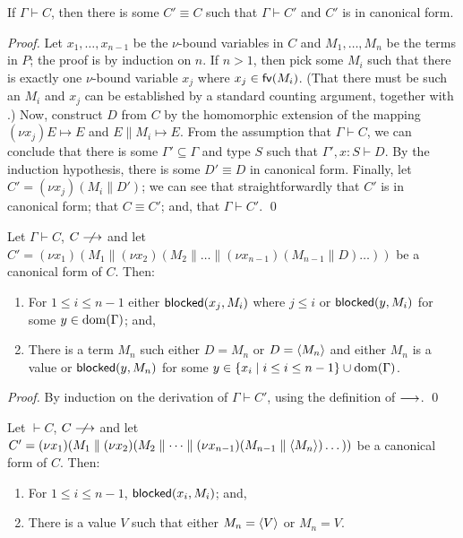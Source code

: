 \documentclass[orivec,envcountsame]{llncs}
\begin{document}
\begin{lemma}\label{thm:canonical}
  If $\Gamma \vdash C$, then there is some $C' \equiv C$ such that $\Gamma \vdash C'$ and $C'$ is in
  canonical form.
\end{lemma}

\begin{proof}
  Let $x_1,\dots,x_{n-1}$ be the $\nu$-bound variables in $C$ and $M_1,\dots,M_n$ be the terms in
  $P$; the proof is by induction on $n$.  If $n > 1$, then pick some $M_i$ such that there is
  exactly one $\nu$-bound variable $x_j$ where $x_j \in \mathsf{fv}(M_i)$.  (That there must be such an
  $M_i$ and $x_j$ can be established by a standard counting argument, together with
  .)  Now, construct $D$ from $C$ by the homomorphic extension of
  the mapping $(\nu x_j)E \mapsto E$ and $E \parallel M_i \mapsto E$.  From the assumption that
  $\Gamma \vdash C$, we can conclude that there is some $\Gamma' \subseteq \Gamma$ and type $S$ such
  that $\Gamma',x:S \vdash D$.  By the induction hypothesis, there is some $D' \equiv D$ in
  canonical form.  Finally, let $C' = (\nu x_j)(M_i \parallel D')$; we can see that
  straightforwardly that $C'$ is in canonical form; that $C \equiv C'$; and, that $\Gamma \vdash
  C'$. \qed
\end{proof}

\begin{theorem}\label{thm:progress-open}
  Let $\Gamma \vdash C$, $C \centernot\ceval$ and let $C' = (\nu x_1)(M_1 \parallel (\nu
  x_2)(M_2 \parallel \dots \parallel (\nu x_{n-1})(M_{n-1} \parallel D)\dots))$ be
  a canonical form of $C$.  Then:
  \begin{enumerate}
  \item For $1 \leq i \leq n - 1$ either $\mathsf{blocked}(x_j,M_i)$ where $j \leq i$ or $\mathsf{blocked}(y,M_i)$
    for some $y \in \operatorname{dom}(\Gamma)$; and,
  \item There is a term $M_n$ such either $D = M_n$ or $D = \langle M_n \rangle$ and either $M_n$ is a
    value or $\mathsf{blocked}(y,M_n)$ for some $y \in \{ x_i \mid i \leq i \leq n - 1 \} \cup
    \operatorname{dom}(\Gamma)$.
  \end{enumerate}
\end{theorem}

\begin{proof}
  By induction on the derivation of $\Gamma \vdash C'$, using the definition of $\longrightarrow$. \qed
\end{proof}

\begin{corollary}\label{thm:progress}
  Let $\vdash C$, $C \centernot\ceval$ and let $C' = (\nu x_1)(M_1 \parallel (\nu
  x_2)(M_2 \parallel \dots \parallel (\nu x_{n-1})(M_{n-1} \parallel \langle M_n \rangle)\dots))$ be
  a canonical form of $C$.  Then:
  \begin{enumerate}
  \item For $1 \leq i \leq n - 1$, $\mathsf{blocked}(x_i,M_i)$; and,
  \item There is a value $V$ such that either $M_n = \langle V \rangle$ or $M_n = V$.
  \end{enumerate}
\end{corollary}
\end{document}
